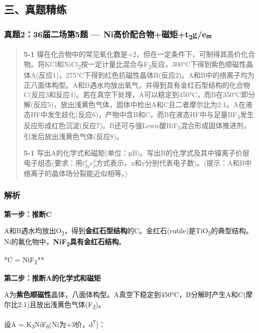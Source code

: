 \subsection{三、真题精练}\label{ux4e09ux771fux9898ux7cbeux7ec3-4}

\subsubsection{\texorpdfstring{真题2：36届二场第5题 --- Ni高价配合物+磁矩+t\textsubscript{2}g/eₘ}{真题2：36届二场第5题 --- Ni高价配合物+磁矩+t2g/eₘ}}\label{ux771fux9898236ux5c4aux4e8cux573aux7b2c5ux9898-niux9ad8ux4ef7ux914dux5408ux7269ux78c1ux77e9t2geux2098}

\begin{quote}
\textbf{5-1} 镍在化合物中的常见氧化数是+2，但在一定条件下，可制得其高价化合物。将KCl和NiCl\textsubscript{2}按一定计量比混合与F\textsubscript{2}反应，300°C下得到紫色顺磁性晶体A(反应1)，275°C下得到红色抗磁性晶体B(反应2)。A和B中的络离子均为正八面体构型。A和B遇水均放出氧气，并得到具有金红石型结构的化合物C(反应3和反应4)。若在真空下处理，A可以稳定到450°C，而B在350°C即分解(反应5)，放出浅黄色气体，固体中检出A和C且二者摩尔比为2:1。A在液态HF中发生歧化(反应6)，产物中含B和C，而B在液态HF中与足量BF\textsubscript{3}发生反应形成红色沉淀(反应7)。B还可与强Lewis酸BiF\textsubscript{5}混合形成固体推进剂，引发后放出浅黄色气体(反应8)。

\textbf{5-1} 写出A的化学式和磁矩(单位：μB)。写出B的化学式及其中镍离子价层电子组态(要求：用\(t_{2g}^{x}e_{g}^{y}\)方式表示，x和y分别代表电子数)。(提示：A和B中络离子的晶体场分裂能近似相等。)
\end{quote}

\subsubsection{解析}\label{ux89e3ux6790-20}

\textbf{第一步：推断C}

A和B遇水均放出O\textsubscript{2}，得到\textbf{金红石型结构}的C。金红石(rutile)是TiO\textsubscript{2}的典型结构。Ni的氟化物中，\textbf{NiF\textsubscript{2}具有金红石结构}。

\箭 **C = NiF\textsubscript{2}**

\textbf{第二步：推断A的化学式和磁矩}

A为\textbf{紫色顺磁性}晶体，八面体构型。A真空下稳定到450°C，B分解时产生A和C(摩尔比2:1)且放出浅黄色气体(F\textsubscript{2})。

设A = K\textsubscript{3}NiF\textsubscript{6}(Ni为+3价，d\textsuperscript{7})：


